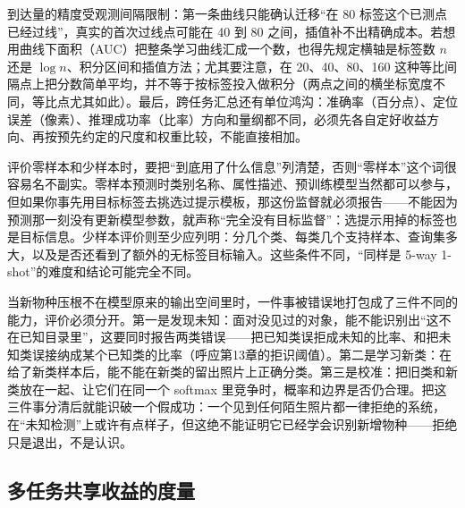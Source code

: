 到达量的精度受观测间隔限制：第一条曲线只能确认迁移“在 80 标签这个已测点已经过线”，真实的首次过线点可能在 40 到 80 之间，插值补不出精确成本。若想用曲线下面积（AUC）把整条学习曲线汇成一个数，也得先规定横轴是标签数 $n$ 还是 $\log n$、积分区间和插值方法；尤其要注意，在 20、40、80、160 这种等比间隔点上把分数简单平均，并不等于按标签投入做积分（两点之间的横坐标宽度不同，等比点尤其如此）。最后，跨任务汇总还有单位鸿沟：准确率（百分点）、定位误差（像素）、推理成功率（比率）方向和量纲都不同，必须先各自定好收益方向、再按预先约定的尺度和权重比较，不能直接相加。

评价零样本和少样本时，要把“到底用了什么信息”列清楚，否则“零样本”这个词很容易名不副实。零样本预测时类别名称、属性描述、预训练模型当然都可以参与，但如果你事先用目标标签去挑选过提示模板，那这份监督就必须报告——不能因为预测那一刻没有更新模型参数，就声称“完全没有目标监督”：选提示用掉的标签也是目标信息。少样本评价则至少应列明：分几个类、每类几个支持样本、查询集多大，以及是否还看到了额外的无标签目标输入。这些条件不同，“同样是 5-way 1-shot”的难度和结论可能完全不同。

当新物种压根不在模型原来的输出空间里时，一件事被错误地打包成了三件不同的能力，评价必须分开。第一是发现未知：面对没见过的对象，能不能识别出“这不在已知目录里”，这要同时报告两类错误——把已知类误拒成未知的比率、和把未知类误接纳成某个已知类的比率（呼应第13章的拒识阈值）。第二是学习新类：在给了新类样本后，能不能在新类的留出照片上正确分类。第三是校准：把旧类和新类放在一起、让它们在同一个 softmax 里竞争时，概率和边界是否仍合理。把这三件事分清后就能识破一个假成功：一个见到任何陌生照片都一律拒绝的系统，在“未知检测”上或许有点样子，但这绝不能证明它已经学会识别新增物种——拒绝只是退出，不是认识。

\subsection{多任务共享收益的度量}
\label{sec:ket-evaluation-sharing}


